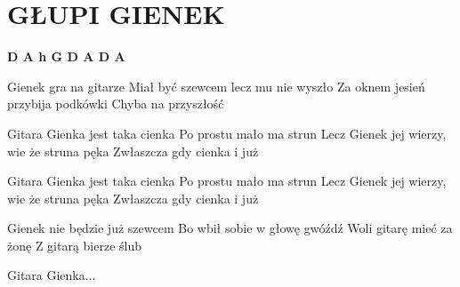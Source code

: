 \documentclass[../../../songbook.tex]{subfiles}
\begin{document}
\TabPositions{8cm} %
\section*{GŁUPI GIENEK}
{}
\vspace{0.5cm}
{\color{red}\textbf{D A h G D A D A} } \newline	

Gienek gra na gitarze 					 \newline	
Miał być szewcem lecz mu nie wyszło		 \newline	
Za oknem jesień przybija podkówki		 \newline	
Chyba na przyszłość						 \newline	

\-\hspace{1cm} Gitara Gienka jest taka cienka	 \newline	
\-\hspace{1cm} Po prostu mało ma strun			 \newline	
\-\hspace{1cm} Lecz Gienek jej wierzy, wie że struna pęka	 \newline	
\-\hspace{1cm} Zwłaszcza gdy cienka i już 		 \newline	

\-\hspace{1cm} Gitara Gienka jest taka cienka \newline	
\-\hspace{1cm} Po prostu mało ma strun \newline	
\-\hspace{1cm} Lecz Gienek jej wierzy, wie że struna pęka \newline	
\-\hspace{1cm} Zwłaszcza gdy cienka i już	 \newline	

Gienek nie będzie już szewcem \newline
Bo wbił sobie w głowę gwóźdź \newline
Woli gitarę mieć za żonę \newline
Z gitarą bierze ślub \newline

\-\hspace{1cm} Gitara Gienka...
\end{document}
